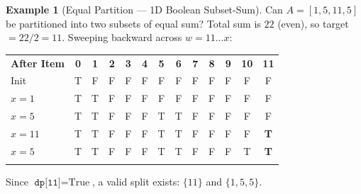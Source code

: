 \documentclass[11pt,a4paper]{article}
\theoremstyle{definition}
\newtheorem{example}{Example}[section]
\begin{document}
\begin{example}[Equal Partition --- 1D Boolean Subset-Sum]
Can $A = [1, 5, 11, 5]$ be partitioned into two subsets of equal sum? Total sum is $22$ (even), so target $= 22 / 2 = 11$. Sweeping backward across $w = 11 \dots x$:

\begin{center}
\begingroup\footnotesize{}
\begin{tabular}{lcccccccccccc}
\arrayrulecolor{primaryblue}\toprule[1.1pt]
\rowcolor{primaryblue!10}
\textcolor{primaryblue}{\textbf{After Item}} & \textbf{0} & \textbf{1} & \textbf{2} & \textbf{3} & \textbf{4} & \textbf{5} & \textbf{6} & \textbf{7} & \textbf{8} & \textbf{9} & \textbf{10} & \textbf{11} \\
\arrayrulecolor{codeframe}\midrule[0.6pt]
Init & T & F & F & F & F & F & F & F & F & F & F & F \\
$x = 1$ & T & T & F & F & F & F & F & F & F & F & F & F \\
$x = 5$ & T & T & F & F & F & T & T & F & F & F & F & F \\
$x = 11$ & T & T & F & F & F & T & T & F & F & F & F & \textbf{T} \\
$x = 5$ & T & T & F & F & F & T & T & F & F & F & T & \textbf{T} \\
\arrayrulecolor{primaryblue}\bottomrule[1.1pt]
\end{tabular}
\endgroup
\end{center}
Since $\texttt{dp[11]} = \text{True}$, a valid split exists: $\{11\}$ and $\{1, 5, 5\}$.
\end{example}
\end{document}
